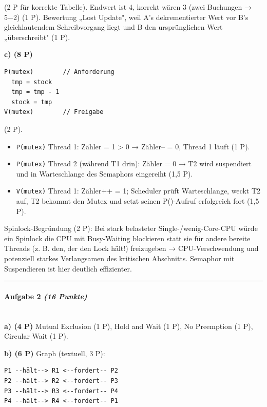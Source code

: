 \documentclass[11pt, a4paper]{article}
\begin{document}
(2 P für korrekte Tabelle). Endwert ist 4, korrekt wären 3 (zwei Buchungen → 5−2) (1 P). Bewertung „Lost Update", weil A's dekrementierter Wert vor B's gleichlautendem Schreibvorgang liegt und B den ursprünglichen Wert „überschreibt" (1 P).


\textbf{c) (8 P)}

\begin{lstlisting}
P(mutex)        // Anforderung
  tmp = stock
  tmp = tmp - 1
  stock = tmp
V(mutex)        // Freigabe
\end{lstlisting}

(2 P).

\begin{itemize}
  \item \texttt{P(mutex)} Thread 1: Zähler = 1 > 0 → Zähler-- = 0, Thread 1 läuft (1 P).
  \item \texttt{P(mutex)} Thread 2 (während T1 drin): Zähler = 0 → T2 wird suspendiert und in Warteschlange des Semaphors eingereiht (1,5 P).
  \item \texttt{V(mutex)} Thread 1: Zähler++ = 1; Scheduler prüft Warteschlange, weckt T2 auf, T2 bekommt den Mutex und setzt seinen P()-Aufruf erfolgreich fort (1,5 P).
\end{itemize}

Spinlock-Begründung (2 P): Bei stark belasteter Single-/wenig-Core-CPU würde ein Spinlock die CPU mit Busy-Waiting blockieren statt sie für andere bereite Threads (z. B. den, der den Lock hält!) freizugeben → CPU-Verschwendung und potenziell starkes Verlangsamen des kritischen Abschnitts. Semaphor mit Suspendieren ist hier deutlich effizienter.



\noindent\textcolor{rulegray}{\rule{\linewidth}{0.4pt}}


\paragraph{Aufgabe 2 \textit{(16 Punkte)}}\mbox{}\\[2pt]

\textbf{a) (4 P)} Mutual Exclusion (1 P), Hold and Wait (1 P), No Preemption (1 P), Circular Wait (1 P).


\textbf{b) (6 P)} Graph (textuell, 3 P):

\begin{lstlisting}
P1 --hält--> R1 <--fordert-- P2
P2 --hält--> R2 <--fordert-- P3
P3 --hält--> R3 <--fordert-- P4
P4 --hält--> R4 <--fordert-- P1
\end{lstlisting}
\end{document}
